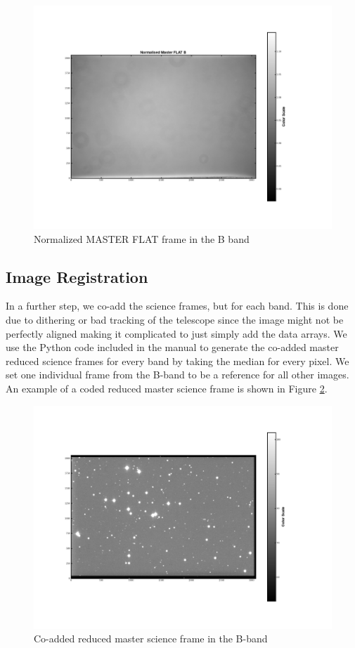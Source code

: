 \documentclass[12pt]{article}
\begin{document}
\begin{figure}[H]
    \centering
    \includegraphics[width=\textwidth]{fig/Normal_Master_FLAT_B.png}
    \caption{Normalized MASTER FLAT frame in the B band}
    \label{normal_master_flat}
\end{figure}

\subsection{Image Registration}
In a further step, we co-add the science frames, but for each band. This is done due to dithering or bad tracking of the telescope since the image might not be perfectly aligned making it complicated to just simply add the data arrays. We use the Python code included in the manual to generate the co-added master reduced science frames for every band by taking the median for every pixel. We set one individual frame from the B-band to be a reference for all other images. An example of a coded reduced master science frame is shown in Figure \ref{co-added}.

\begin{figure}[H]
    \centering
    \includegraphics[width=\textwidth]{fig/Co-added_reduced_master_B.png}
    \caption{ Co-added reduced master science frame in the B-band}
    \label{co-added}
\end{figure}
\end{document}
